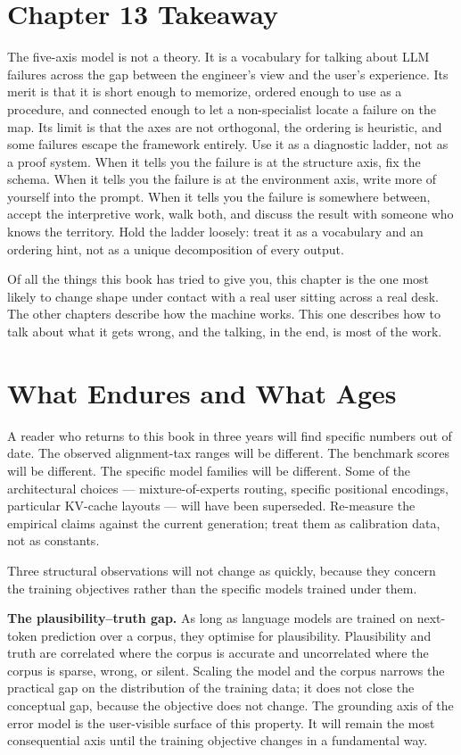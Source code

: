 \section{Chapter 13 Takeaway}

The five-axis model is not a theory. It is a vocabulary for
talking about LLM failures across the gap between the engineer's
view and the user's experience. Its merit is that it is short
enough to memorize, ordered enough to use as a procedure, and
connected enough to let a non-specialist locate a failure on the
map. Its limit is that the axes are not orthogonal, the ordering
is heuristic, and some failures escape the framework entirely. Use
it as a diagnostic ladder, not as a proof system. When it tells
you the failure is at the structure axis, fix the schema. When it
tells you the failure is at the environment axis, write more of
yourself into the prompt. When it tells you the failure is
somewhere between, accept the interpretive work, walk both, and
discuss the result with someone who knows the territory. Hold the
ladder loosely: treat it as a vocabulary and an ordering hint,
not as a unique decomposition of every output.

Of all the things this book has tried to give you, this chapter is
the one most likely to change shape under contact with a real user
sitting across a real desk. The other chapters describe how the
machine works. This one describes how to talk about what it gets
wrong, and the talking, in the end, is most of the work.

\section{What Endures and What Ages}
\label{sec:ch13-what-endures}

A reader who returns to this book in three years will find specific
numbers out of date. The observed alignment-tax ranges will be
different. The benchmark scores will be different. The specific
model families will be different. Some of the architectural choices
--- mixture-of-experts routing, specific positional encodings,
particular KV-cache layouts --- will have been superseded.
Re-measure the empirical claims against the current generation;
treat them as calibration data, not as constants.

Three structural observations will not change as quickly, because
they concern the training objectives rather than the specific models
trained under them.

\textbf{The plausibility--truth gap.} As long as language models are
trained on next-token prediction over a corpus, they optimise for
plausibility. Plausibility and truth are correlated where the corpus
is accurate and uncorrelated where the corpus is sparse, wrong, or
silent. Scaling the model and the corpus narrows the practical gap
on the distribution of the training data; it does not close the
conceptual gap, because the objective does not change. The grounding
axis of the error model is the user-visible surface of this
property. It will remain the most consequential axis until the
training objective changes in a fundamental way.

